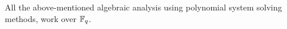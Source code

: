 
All the above-mentioned algebraic analysis using polynomial system solving methods, work over $\mathbb{F}_q$. 





